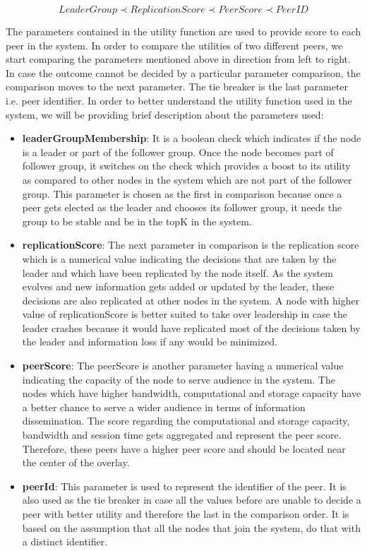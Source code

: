 \documentclass[12pt,a4paper,twoside,openright]{book}
\begin{document}
\small 
\begin{equation*}
    LeaderGroup \prec ReplicationScore \prec PeerScore \prec PeerID
\end{equation*}
\normalsize

The parameters contained in the utility function are used to provide score to each peer in the system. In order to compare the utilities of two different peers, we start comparing the parameters mentioned above in direction from left to right. In case the outcome cannot be decided by a particular parameter comparison, the comparison moves to the next parameter. The tie breaker is the last parameter i.e. peer identifier. In order to better understand the utility function used in the system, we will be providing brief description about the parameters used:

\begin{itemize}


\item \textbf{leaderGroupMembership}: It is a boolean check which indicates if the node is a leader or part of the follower group. Once the node becomes part of follower group, it switches on the check which provides a boost to its utility as compared to other nodes in the system which are not part of the follower group. This parameter is chosen as the first in comparison because once a peer gets elected as the leader and chooses its follower group, it needs the group to be stable and be in the topK in the system. 


\item \textbf{replicationScore}: The next parameter in comparison is the replication score which is a numerical value indicating the decisions that are taken by the leader and which have been replicated by the node itself. As the system evolves and new information gets added or updated by the leader, these decisions are also replicated at other nodes in the system. A node with higher value of replicationScore is better suited to take  over leadership in case the leader crashes because it would have replicated most of the decisions taken by the leader and information loss if any would be minimized.

\item \textbf{peerScore}: The peerScore is another parameter having a numerical value indicating the capacity of the node to serve audience in the system. The nodes which have higher bandwidth, computational and storage capacity have a better chance to serve a wider audience in terms of information dissemination. The score regarding the computational and storage capacity, bandwidth and session time gets aggregated and represent the peer score. Therefore, these peers have a higher peer score and should be located near the center of the overlay.


\item \textbf{peerId}: This parameter is used to represent the identifier of the peer. It is also used as the tie breaker in case all the values before are unable to decide a peer with better utility and therefore the last in the comparison order. It is based on the assumption that all the nodes that join the system, do that with a distinct identifier.

\end{itemize}
\end{document}
